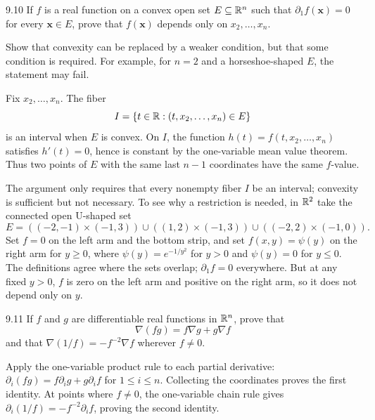 \documentclass[11pt,oneside]{article}
\begin{document}
\begin{exercise}{9.10}
If $f$ is a real function on a convex open set $E\subseteq\mathbb{R}^n$ such that $\partial_1f(\mathbf x)=0$ for every $\mathbf x\in E$, prove that $f(\mathbf x)$ depends only on $x_2,\ldots,x_n$.

Show that convexity can be replaced by a weaker condition, but that some condition is required. For example, for $n=2$ and a horseshoe-shaped $E$, the statement may fail.
\end{exercise}
\begin{solution}
Fix $x_2,\ldots,x_n$. The fiber
\[
 I=\{t\in\mathbb{R}:(t,x_2,\ldots,x_n)\in E\}
\]
is an interval when $E$ is convex. On $I$, the function $h(t)=f(t,x_2,\ldots,x_n)$ satisfies $h'(t)=0$, hence is constant by the one-variable mean value theorem. Thus two points of $E$ with the same last $n-1$ coordinates have the same $f$-value.

The argument only requires that every nonempty fiber $I$ be an interval; convexity is sufficient but not necessary. To see why a restriction is needed, in $\mathbb{R}^2$ take the connected open U-shaped set
\[
 E=((-2,-1)\times(-1,3))\cup((1,2)\times(-1,3))
   \cup((-2,2)\times(-1,0)).
\]
Set $f=0$ on the left arm and the bottom strip, and set $f(x,y)=\psi(y)$ on the right arm for $y\ge0$, where $\psi(y)=e^{-1/y^2}$ for $y>0$ and $\psi(y)=0$ for $y\le0$. The definitions agree where the sets overlap; $\partial_1f=0$ everywhere. But at any fixed $y>0$, $f$ is zero on the left arm and positive on the right arm, so it does not depend only on $y$.
\end{solution}

\begin{exercise}{9.11}
If $f$ and $g$ are differentiable real functions in $\mathbb{R}^n$, prove that
\[
 \nabla(fg)=f\nabla g+g\nabla f
\]
and that $\nabla(1/f)=-f^{-2}\nabla f$ wherever $f\ne0$.
\end{exercise}
\begin{solution}
Apply the one-variable product rule to each partial derivative:
$\partial_i(fg)=f\partial_i g+g\partial_i f$ for $1\le i\le n$. Collecting the coordinates proves the first identity. At points where $f\ne0$, the one-variable chain rule gives $\partial_i(1/f)=-f^{-2}\partial_i f$, proving the second identity.
\end{solution}
\end{document}
